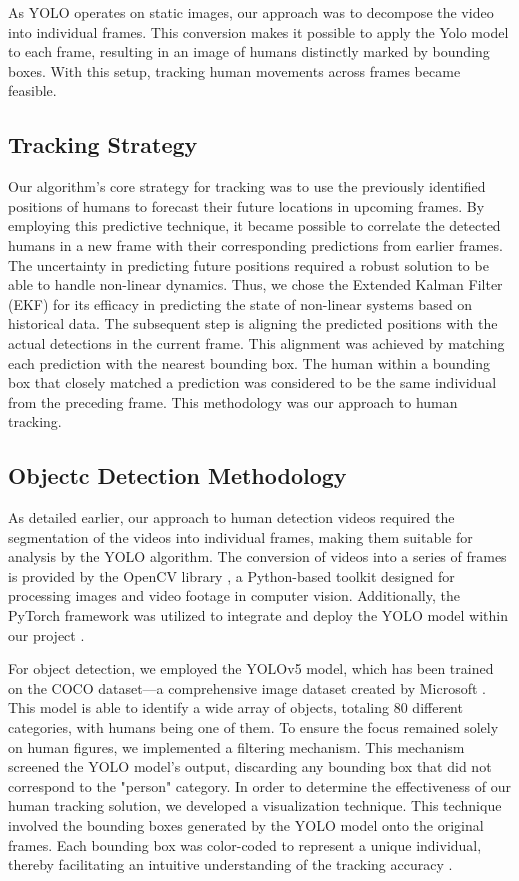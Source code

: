 \documentclass{article}
\begin{document}
As YOLO operates on static images, our approach was to decompose the video into individual frames. This conversion makes it possible to apply the Yolo model to each frame, resulting in an image of humans distinctly marked by bounding boxes. With this setup, tracking human movements across frames became feasible.

\subsection{Tracking Strategy}
Our algorithm's core strategy for tracking was to use the previously identified positions of humans to forecast their future locations in upcoming frames. By employing this predictive technique, it became possible to correlate the detected humans in a new frame with their corresponding predictions from earlier frames. The uncertainty in predicting future positions required a robust solution to be able to handle non-linear dynamics. Thus, we chose the Extended Kalman Filter (EKF) for its efficacy in predicting the state of non-linear systems based on historical data.
The subsequent step is aligning the predicted positions with the actual detections in the current frame. This alignment was achieved by matching each prediction with the nearest bounding box. The human within a bounding box that closely matched a prediction was considered to be the same individual from the preceding frame. This methodology was our approach to human tracking. 


\subsection{Objectc Detection Methodology}
As detailed earlier, our approach to human detection videos required the segmentation of the videos into individual frames, making them suitable for analysis by the YOLO algorithm. The conversion of videos into a series of frames is provided by the OpenCV library \cite{opencv}, a Python-based toolkit designed for processing images and video footage in computer vision. Additionally, the PyTorch framework was utilized to integrate and deploy the YOLO model within our project \cite{pytorch}.

For object detection, we employed the YOLOv5 model, which has been trained on the COCO dataset—a comprehensive image dataset created by Microsoft \cite{lin2014microsoft}.
This model is able to identify a wide array of objects, totaling 80 different categories, with humans being one of them. To ensure the focus remained solely on human figures, we implemented a filtering mechanism. This mechanism screened the YOLO model's output, discarding any bounding box that did not correspond to the "person" category. In order to determine the effectiveness of our human tracking solution, we developed a visualization technique. This technique involved the bounding boxes generated by the YOLO model onto the original frames. Each bounding box was color-coded to represent a unique individual, thereby facilitating an intuitive understanding of the tracking accuracy \cite{ourvisualization2023}.
\end{document}
